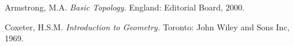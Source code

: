
\begin{thebibliography}{25}
Armstrong, M.A. 
\emph{Basic Topology.} 
England:
Editorial Board, 2000.

Coxeter, H.S.M.
\emph{Introduction to Geometry.} 
Toronto:
John Wiley and Sons Inc, 1969.
\end{thebibliography}


